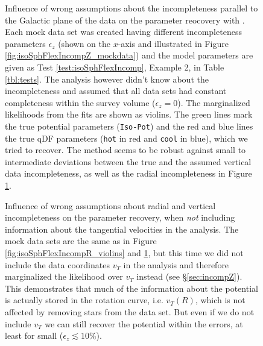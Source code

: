 \begin{figure}
\begin{minipage}{.45\textwidth}
\caption{Influence of wrong assumptions about the incompleteness parallel to the Galactic plane of the data on the parameter reocovery with \RM{}. Each mock data set was created having different incompleteness parameters $\epsilon_z$ (shown on the $x$-axis and illustrated in Figure \ref{fig:isoSphFlexIncompZ_mockdata}) and the model parameters are given as Test \ref{test:isoSphFlexIncomp}, Example 2, in Table \ref{tbl:tests}. The analysis however didn't know about the incompleteness and assumed that all data sets had constant completeness within the survey volume ($\epsilon_z = 0$). The marginalized likelihoods from the fits are shown as violins. The green lines mark the true potential parameters (\texttt{Iso-Pot}) and the red and blue lines the true qDF parameters (\texttt{hot} \MAP{} in red and \texttt{cool} \MAP{} in blue), which we tried to recover. The \RM{} method seems to be robust against small to intermediate deviations between the true and the assumed vertical data incompleteness, as well as the radial incompleteness in Figure \ref{fig:isoSphFlexIncompZ_violins}.} 
\label{fig:isoSphFlexIncompZ_violins}
\end{minipage}
\end{figure}


\begin{figure}
\caption{Influence of wrong assumptions about radial and vertical incompleteness on the parameter recovery, when \emph{not} including information about the tangential velocities in the analysis. The mock data sets are the same as in Figure \ref{fig:isoSphFlexIncompR_violins} and \ref{fig:isoSphFlexIncompZ_violins}, but this time we did not include the data coordinates $v_T$ in the analysis and therefore marginalized the likelihood over $v_T$ instead (see \S\ref{sec:incompZ}). This demonstrates that much of the information about the potential is actually stored in the rotation curve, i.e. $v_T(R)$, which is not affected by removing stars from the data set. But even if we do not include $v_T$ we can still recover the potential within the errors, at least for small ($\epsilon_z \lesssim 10\%$).} 
\label{fig:isoSphFlexIncomp_marginal_violins}
\end{figure}

